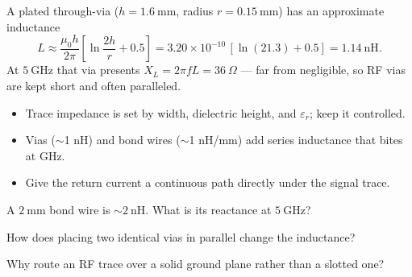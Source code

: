 \begin{workedexample}
A plated through-via ($h = 1.6\ \text{mm}$, radius $r = 0.15\ \text{mm}$)
has an approximate inductance
\[ L \approx \frac{\mu_0 h}{2\pi}\!\left[\ln\!\frac{2h}{r} + 0.5\right]
   = 3.20\times10^{-10}\,[\ln(21.3) + 0.5] = 1.14\ \text{nH}. \]
At $5\ \text{GHz}$ that via presents $X_L = 2\pi f L = 36\ \Omega$ --- far from
negligible, so RF vias are kept short and often paralleled.
\end{workedexample}

\begin{keytakeaways}
\begin{itemize}[leftmargin=1.4em,itemsep=2pt]
\item Trace impedance is set by width, dielectric height, and $\varepsilon_r$; keep it controlled.
\item Vias ($\sim$1 nH) and bond wires ($\sim$1 nH/mm) add series inductance that bites at GHz.
\item Give the return current a continuous path directly under the signal trace.
\end{itemize}
\end{keytakeaways}

\begin{exercises}
\item A $2\ \text{mm}$ bond wire is $\sim2\ \text{nH}$. What is its reactance at $5\ \text{GHz}$?
\item How does placing two identical vias in parallel change the inductance?
\item Why route an RF trace over a solid ground plane rather than a slotted one?
\end{exercises}

